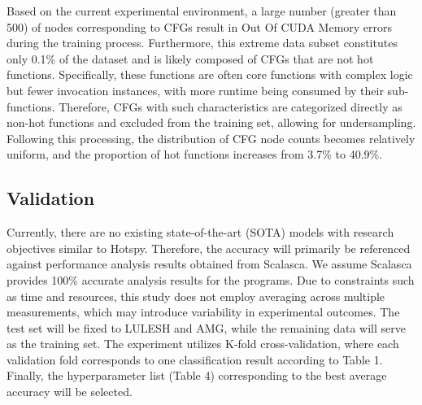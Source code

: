\documentclass[lineno,sn-mathphys]{sn-jnl}%
\theoremstyle{thmstyleone}%
\theoremstyle{thmstyletwo}%
\theoremstyle{thmstylethree}%
\begin{document}
 Based on the current experimental environment, a large number (greater than 500) of nodes corresponding to CFGs result in Out Of CUDA Memory errors during the training process. Furthermore, this extreme data subset constitutes only 0.1\% of the dataset and is likely composed of CFGs that are not hot functions. Specifically, these functions are often core functions with complex logic but fewer invocation instances, with more runtime being consumed by their sub-functions. Therefore, CFGs with such characteristics are categorized directly as non-hot functions and excluded from the training set, allowing for undersampling. Following this processing, the distribution of CFG node counts becomes relatively uniform, and the proportion of hot functions increases from 3.7\% to 40.9\%.
 \subsection{Validation}\label{subsec2}
 Currently, there are no existing state-of-the-art (SOTA) models with research objectives similar to Hotspy. Therefore, the accuracy will primarily be referenced against performance analysis results obtained from Scalasca. We assume Scalasca provides 100\% accurate analysis results for the programs. Due to constraints such as time and resources, this study does not employ averaging across multiple measurements, which may introduce variability in experimental outcomes.
 The test set will be fixed to LULESH and AMG, while the remaining data will serve as the training set. The experiment utilizes K-fold cross-validation, where each validation fold corresponds to one classification result according to Table 1. Finally, the hyperparameter list (Table 4) corresponding to the best average accuracy will be selected.
\end{document}
